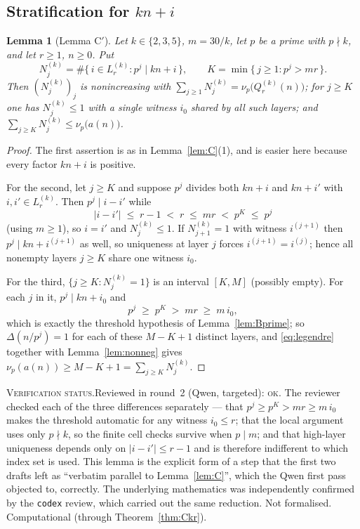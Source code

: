 \documentclass[11pt]{article}
\theoremstyle{plain}
\newtheorem{lemma}[theorem]{Lemma}
\theoremstyle{definition}
\theoremstyle{remark}
\numberwithin{equation}{section}
\newcommand{\vstatus}[1]{%
  \par\vspace{3pt}\noindent
  {\small\textsc{Verification status.}\enspace #1}\par\vspace{3pt}}
\begin{document}
\subsection{Stratification for $kn+i$}

\begin{lemma}[Lemma C$'$]
\label{lem:Cprime}
Let $k \in \{2,3,5\}$, $m = 30/k$, let $p$ be a prime with $p \nmid k$, and let $r \ge 1$,
$n \ge 0$. Put
\[
  N^{(k)}_j = \#\{\, i \in L^{(k)}_r : p^j \mid kn+i \,\},
  \qquad
  K = \min\{\, j \ge 1 : p^j > m r \,\} .
\]
Then $(N^{(k)}_j)_j$ is nonincreasing with $\sum_{j \ge 1} N^{(k)}_j = \nu_p\bigl(Q^{(k)}_r(n)
\bigr)$; for $j \ge K$ one has $N^{(k)}_j \le 1$ with a single witness $i_0$ shared by all such
layers; and $\sum_{j \ge K} N^{(k)}_j \le \nu_p\bigl(a(n)\bigr)$.
\end{lemma}

\begin{proof}
The first assertion is as in Lemma~\ref{lem:C}(1), and is easier here because every factor
$kn+i$ is positive.

For the second, let $j \ge K$ and suppose $p^j$ divides both $kn+i$ and $kn+i'$ with
$i,i' \in L^{(k)}_r$. Then $p^j \mid i-i'$ while
\[
  |i - i'| \;\le\; r-1 \;<\; r \;\le\; m r \;<\; p^K \;\le\; p^j
\]
(using $m \ge 1$), so $i = i'$ and $N^{(k)}_j \le 1$. If $N^{(k)}_{j+1} = 1$ with witness
$i^{(j+1)}$ then $p^j \mid kn + i^{(j+1)}$ as well, so uniqueness at layer $j$ forces
$i^{(j+1)} = i^{(j)}$; hence all nonempty layers $j \ge K$ share one witness $i_0$.

For the third, $\{j \ge K : N^{(k)}_j = 1\}$ is an interval $[K,M]$ (possibly empty). For each
$j$ in it, $p^j \mid kn + i_0$ and
\[
  p^j \;\ge\; p^K \;>\; m r \;\ge\; m\,i_0 ,
\]
which is exactly the threshold hypothesis of Lemma~\ref{lem:Bprime}; so $\Delta(n/p^j) = 1$ for
each of these $M-K+1$ distinct layers, and \eqref{eq:legendre} together with
Lemma~\ref{lem:nonneg} gives $\nu_p(a(n)) \ge M-K+1 = \sum_{j\ge K} N^{(k)}_j$.
\end{proof}
\vstatus{Reviewed in round~2 (Qwen, targeted): \textsc{ok}. The reviewer checked each of the three
differences separately --- that $p^j \ge p^K > mr \ge m\,i_0$ makes the threshold automatic for
any witness $i_0 \le r$; that the local argument uses only $p \nmid k$, so the finite cell checks
survive when $p \mid m$; and that high-layer uniqueness depends only on $|i-i'| \le r-1$ and is
therefore indifferent to which index set is used. This lemma is the explicit form of a step that
the first two drafts left as ``verbatim parallel to Lemma~\ref{lem:C}'', which the Qwen first
pass objected to, correctly. The underlying mathematics was independently confirmed by the
\texttt{codex} review, which carried out the same reduction. Not formalised. Computational
(through Theorem~\ref{thm:Ckr}).}
\end{document}
